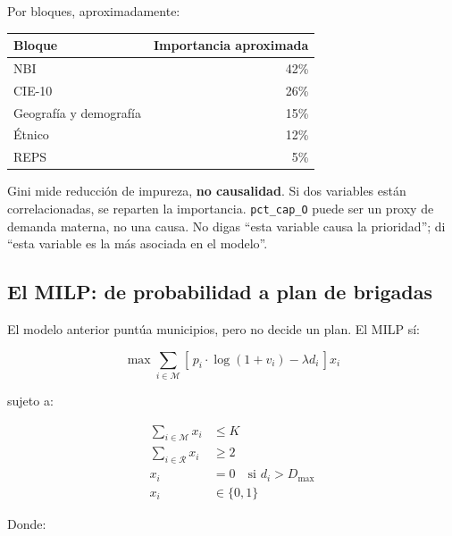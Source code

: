 \documentclass[11pt,a4paper]{article}
\newcommand{\code}[1]{\texttt{#1}}
\begin{document}
Por bloques, aproximadamente:

\begin{table}[H]
\centering
\small
\begin{tabular}{@{}l r@{}}
\toprule
\textbf{Bloque} & \textbf{Importancia aproximada} \\
\midrule
NBI & 42\% \\
CIE-10 & 26\% \\
Geografía y demografía & 15\% \\
Étnico & 12\% \\
REPS & 5\% \\
\bottomrule
\end{tabular}
\end{table}

\begin{tcolorbox}[ojo,title={Advertencia sobre Gini}]
Gini mide reducción de impureza, \textbf{no causalidad}. Si dos variables están correlacionadas, se reparten la importancia. \code{pct_cap_O} puede ser un proxy de demanda materna, no una causa. No digas ``esta variable causa la prioridad''; di ``esta variable es la más asociada en el modelo''.
\end{tcolorbox}

\subsection{El MILP: de probabilidad a plan de brigadas}

El modelo anterior puntúa municipios, pero no decide un plan. El MILP sí:

\begin{equation}
\max \sum_{i \in \mathcal{M}}
\left[\, p_i \cdot \log(1 + v_i) - \lambda d_i \,\right] x_i
\end{equation}

sujeto a:

\begin{align}
\sum_{i \in \mathcal{M}} x_i &\le K \\
\sum_{i \in \mathcal{R}} x_i &\ge 2 \\
x_i &= 0 \quad \text{si } d_i > D_{\max} \\
x_i &\in \{0,1\}
\end{align}

Donde:
\end{document}
